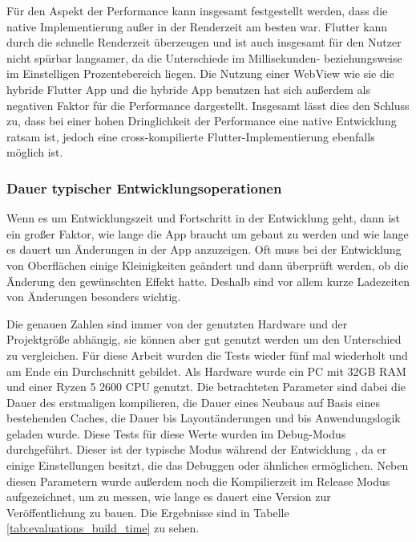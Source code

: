 Für den Aspekt der Performance kann insgesamt festgestellt werden, dass die native Implementierung außer in der Renderzeit am besten war. Flutter kann durch die schnelle Renderzeit überzeugen und ist auch insgesamt für den Nutzer nicht spürbar langsamer, da die Unterschiede im Millisekunden- beziehungsweise im Einstelligen Prozentebereich liegen. Die Nutzung einer WebView wie sie die hybride Flutter App und die hybride App benutzen hat sich außerdem als negativen Faktor für die Performance dargestellt.
Insgesamt lässt dies den Schluss zu, dass bei einer hohen Dringlichkeit der Performance eine native Entwicklung ratsam ist, jedoch eine cross-kompilierte Flutter-Implementierung ebenfalls möglich ist.

\subsubsection{Dauer typischer Entwicklungsoperationen}
Wenn es um Entwicklungszeit und Fortschritt in der Entwicklung geht, dann ist ein großer Faktor, wie lange die App braucht um gebaut zu werden und wie lange es dauert um Änderungen in der App anzuzeigen. Oft muss bei der Entwicklung von Oberflächen einige Kleinigkeiten geändert und dann überprüft werden, ob die Änderung den gewünschten Effekt hatte. Deshalb sind vor allem kurze Ladezeiten von Änderungen besonders wichtig.

Die genauen Zahlen sind immer von der genutzten Hardware und der Projektgröße abhängig, sie können aber gut genutzt werden um den Unterschied zu vergleichen. 
Für diese Arbeit wurden die Tests wieder fünf mal wiederholt und am Ende ein Durchschnitt gebildet. Als Hardware wurde ein PC mit 32GB RAM und einer Ryzen 5 2600 CPU genutzt. 
Die betrachteten Parameter sind dabei die Dauer des erstmaligen kompilieren, die Dauer eines Neubaus auf Basis eines bestehenden Caches, die Dauer bis Layoutänderungen und bis Anwendungslogik geladen wurde. Diese Tests für diese Werte wurden im Debug-Modus durchgeführt. Dieser ist der typische Modus während der Entwicklung , da er einige Einstellungen besitzt, die das Debuggen oder ähnliches ermöglichen. Neben diesen Parametern wurde außerdem noch die Kompilierzeit im Release Modus aufgezeichnet, um zu messen, wie lange es dauert eine Version zur Veröffentlichung zu bauen. Die Ergebnisse sind in Tabelle \ref{tab:evaluations_build_time} zu sehen.

